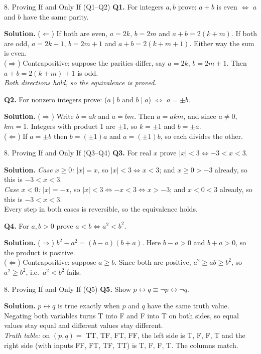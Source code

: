 \documentclass[aspectratio=169,10pt]{beamer}
\newcommand{\qa}[3]{%
  \textbf{Q#1.} #2\par\smallskip
  {\color{ans}\textbf{Solution.} #3}\par\vspace{6pt}}
\begin{document}
\begin{frame}{8. Proving If and Only If (Q1--Q2)}
\footnotesize
\qa{1}{For integers $a,b$ prove: $a+b$ is even $\iff$ $a$ and $b$ have the same parity.}
{($\Leftarrow$) If both are even, $a=2k$, $b=2m$ and $a+b=2(k+m)$. If both are odd, $a=2k+1$, $b=2m+1$ and $a+b=2(k+m+1)$. Either way the sum is even.\\
($\Rightarrow$) Contrapositive: suppose the parities differ, say $a=2k$, $b=2m+1$. Then $a+b=2(k+m)+1$ is odd.\\
\emph{Both directions hold, so the equivalence is proved.}}
\qa{2}{For nonzero integers prove: ($a\mid b$ and $b\mid a$) $\iff$ $a=\pm b$.}
{($\Rightarrow$) Write $b=ak$ and $a=bm$. Then $a=akm$, and since $a\ne0$, $km=1$. Integers with product 1 are $\pm1$, so $k=\pm1$ and $b=\pm a$.\\
($\Leftarrow$) If $a=\pm b$ then $b=(\pm1)a$ and $a=(\pm1)b$, so each divides the other.}
\end{frame}

\begin{frame}{8. Proving If and Only If (Q3--Q4)}
\footnotesize
\qa{3}{For real $x$ prove $|x|<3\iff-3<x<3$.}
{\emph{Case $x\ge0$:} $|x|=x$, so $|x|<3\iff x<3$; and $x\ge0>-3$ already, so this is $-3<x<3$.\\
\emph{Case $x<0$:} $|x|=-x$, so $|x|<3\iff-x<3\iff x>-3$; and $x<0<3$ already, so this is $-3<x<3$.\\
Every step in both cases is reversible, so the equivalence holds.}
\qa{4}{For $a,b>0$ prove $a<b\iff a^2<b^2$.}
{($\Rightarrow$) $b^2-a^2=(b-a)(b+a)$. Here $b-a>0$ and $b+a>0$, so the product is positive.\\
($\Leftarrow$) Contrapositive: suppose $a\ge b$. Since both are positive, $a^2\ge ab\ge b^2$, so $a^2\ge b^2$, i.e.\ $a^2<b^2$ fails.}
\end{frame}

\begin{frame}{8. Proving If and Only If (Q5)}
\footnotesize
\qa{5}{Show $p\leftrightarrow q\equiv\neg p\leftrightarrow\neg q$.}
{$p\leftrightarrow q$ is true exactly when $p$ and $q$ have the same truth value.\\
Negating both variables turns T into F and F into T on both sides, so equal values stay equal and different values stay different.\\
\emph{Truth table:} on $(p,q)=$ TT, TF, FT, FF, the left side is T, F, F, T and the right side (with inputs FF, FT, TF, TT) is T, F, F, T. The columns match.}
\end{frame}
\end{document}
